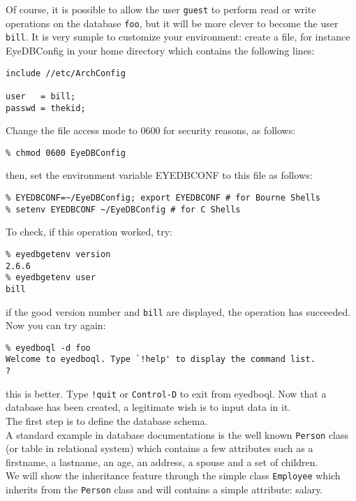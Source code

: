 \normalsize
Of course, it is possible to allow the user \texttt{guest} to perform
read or write operations on the database \texttt{foo}, but it will be
more clever to become the user \texttt{bill}.
It is very sumple to customize your environment:
create a file, for instance EyeDBConfig in your home
directory which contains the following lines:
\verbsize \begin{verbatim}
include //etc/ArchConfig
 
user   = bill;
passwd = thekid;
\end{verbatim}
\normalsize
Change the file access mode to 0600 for security reasons, as follows:
\verbsize \begin{verbatim}
% chmod 0600 EyeDBConfig
\end{verbatim}
\normalsize
then, set the environment variable EYEDBCONF to this file as follows:
\verbsize \begin{verbatim}
% EYEDBCONF=~/EyeDBConfig; export EYEDBCONF # for Bourne Shells
\end{verbatim}
\normalsize
To check, if this operation worked, try:
\verbsize \begin{verbatim}
% eyedbgetenv version
2.6.6
bill
\end{verbatim}
\normalsize
if the good version number \texttt{\eyedbversion} and \texttt{bill} are displayed,
the operation has succeeded.
\\
Now you can try again:
\verbsize \begin{verbatim}
% eyedboql -d foo
Welcome to eyedboql. Type `!help' to display the command list.
? 
\end{verbatim}
\normalsize
this is better. Type \texttt{!quit} or \texttt{Control-D} to exit from
eyedboql.
Now that a database has been created, a legitimate wish is to input data
in it.
\\
The first step is to define the database schema.
\\
A standard example in database documentations is the well known
\texttt{Person} class (or table in relational system) which contains
a few attributes such as a firstname, a lastname, an age, an address, a spouse
and a set of children.
\\
We will show the inheritance feature through the simple class \texttt{Employee}
which inherits from the \texttt{Person} class and will contains a simple
attribute: salary.
\\
